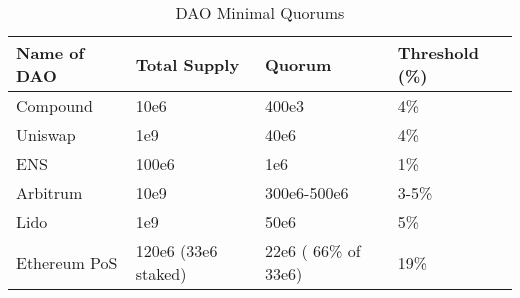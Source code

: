 \begin{table*}[t]
    \centering
    \caption{DAO Minimal Quorums}
    \label{table:dao-metrics}
    \begin{tabular}{|l|l|l|l|}
    \hline
    \textbf{Name of DAO} & \textbf{Total Supply} & \textbf{Quorum} & \textbf{Threshold (\%)} \\ \hline
    Compound             & 10e6            & 400e3             & 4\%                     \\ \hline
    Uniswap              & 1e9             & 40e6              & 4\%                     \\ \hline
    ENS                  & 100e6           & 1e6               & 1\%                     \\ \hline
    Arbitrum             & 10e9            & 300e6-500e6       & 3-5\%                   \\ \hline
    Lido                 & 1e9             & 50e6              & 5\%                     \\ \hline
    Ethereum PoS         & 120e6 (33e6 staked)          & 22e6 ( 66\% of 33e6)& 19\%                    \\ \hline
    \end{tabular}
\end{table*}